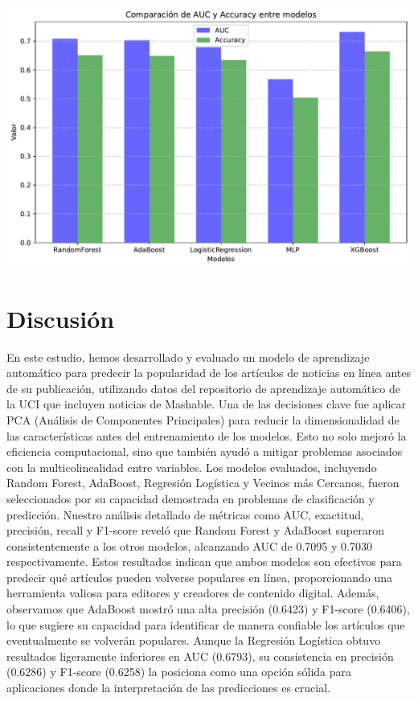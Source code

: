 \documentclass[
  number,
  preprint,
  3p,
  twocolumn]{elsarticle}
\begin{document}
\includegraphics{Articulo_v2_files/figure-pdf/cell-7-output-1.pdf}

\section{Discusión}\label{discusiuxf3n}

En este estudio, hemos desarrollado y evaluado un modelo de aprendizaje
automático para predecir la popularidad de los artículos de noticias en
línea antes de su publicación, utilizando datos del repositorio de
aprendizaje automático de la UCI que incluyen noticias de Mashable. Una
de las decisiones clave fue aplicar PCA (Análisis de Componentes
Principales) para reducir la dimensionalidad de las características
antes del entrenamiento de los modelos. Esto no solo mejoró la
eficiencia computacional, sino que también ayudó a mitigar problemas
asociados con la multicolinealidad entre variables. Los modelos
evaluados, incluyendo Random Forest, AdaBoost, Regresión Logística y
Vecinos más Cercanos, fueron seleccionados por su capacidad demostrada
en problemas de clasificación y predicción. Nuestro análisis detallado
de métricas como AUC, exactitud, precisión, recall y F1-score reveló que
Random Forest y AdaBoost superaron consistentemente a los otros modelos,
alcanzando AUC de 0.7095 y 0.7030 respectivamente. Estos resultados
indican que ambos modelos son efectivos para predecir qué artículos
pueden volverse populares en línea, proporcionando una herramienta
valiosa para editores y creadores de contenido digital. Además,
observamos que AdaBoost mostró una alta precisión (0.6423) y F1-score
(0.6406), lo que sugiere su capacidad para identificar de manera
confiable los artículos que eventualmente se volverán populares. Aunque
la Regresión Logística obtuvo resultados ligeramente inferiores en AUC
(0.6793), su consistencia en precisión (0.6286) y F1-score (0.6258) la
posiciona como una opción sólida para aplicaciones donde la
interpretación de las predicciones es crucial.
\end{document}

